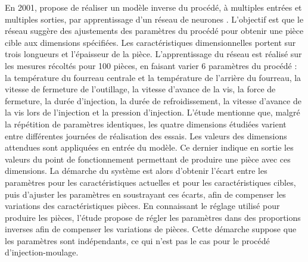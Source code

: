 En 2001, \citeauthor{lau_neural_2001} propose de réaliser un modèle inverse du procédé, à multiples entrées et multiples sorties, par apprentissage d'un réseau de neurones \cite{lau_neural_2001}. %
L’objectif est que le réseau suggère des ajustements des paramètres du procédé pour obtenir une pièce cible aux dimensions spécifiées.
Les caractéristiques dimensionnelles portent sur trois longueurs et l'épaisseur de la pièce.
L'apprentissage du réseau est réalisé sur les mesures récoltés pour 100 pièces, en faisant varier 6 paramètres du procédé : la température du fourreau centrale et la température de l'arrière du fourreau, la vitesse de fermeture de l’outillage, la vitesse d’avance de la vis, la force de fermeture, la durée d'injection, la durée de refroidissement, la vitesse d'avance de la vis lors de l'injection et la pression d'injection.
L'étude mentionne que, malgré la répétition de paramètres identiques, les quatre dimensions étudiées varient entre différentes journées de réalisation des essais.
Les valeurs des dimensions attendues sont appliquées en entrée du modèle.
Ce dernier indique en sortie les valeurs du point de fonctionnement permettant de produire une pièce avec ces dimensions.
La démarche du système est alors d'obtenir l'écart entre les paramètres pour les caractéristiques actuelles et pour les caractéristiques cibles, puis d'ajuster les paramètres en soustrayant ces écarts, afin de compenser les variations des caractéristiques pièces.
En connaissant le réglage utilisé pour produire les pièces, l'étude propose de régler les paramètres dans des proportions inverses afin de compenser les variations de pièces.
Cette démarche suppose que les paramètres sont indépendants, ce qui n'est pas le cas pour le procédé d'injection-moulage.

